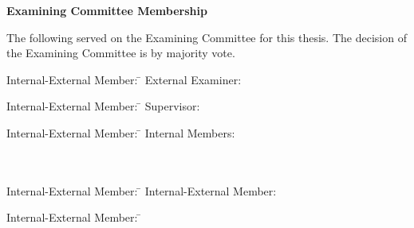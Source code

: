 \pagestyle{plain}
\setcounter{page}{2}

\cleardoublepage %
 
\begin{center}\textbf{Examining Committee Membership}\end{center}
  \noindent
The following served on the Examining Committee for this thesis. The decision of the Examining Committee is by majority vote.
  \bigskip
  
  \noindent
  \begin{tabbing}
  Internal-External Member: \=  \kill %
  External Examiner: \externalexaminer \\
  \end{tabbing} 
  \bigskip
  
  \noindent
  \begin{tabbing}
  Internal-External Member: \=  \kill %
  Supervisor: \supervisor \\
  \end{tabbing}
  \bigskip
  
  \noindent
  \begin{tabbing}
  Internal-External Member: \=  \kill %
  Internal Members: \internalone \\
  \\
  \internaltwo \\
  \end{tabbing}
  \bigskip
  
  \noindent
  \begin{tabbing}
  Internal-External Member: \=  \kill %
  Internal-External Member: \internalexternal \\
  \end{tabbing}
  \bigskip
  
  \noindent
  \begin{tabbing}
  Internal-External Member: \=  \kill %
  \end{tabbing}

